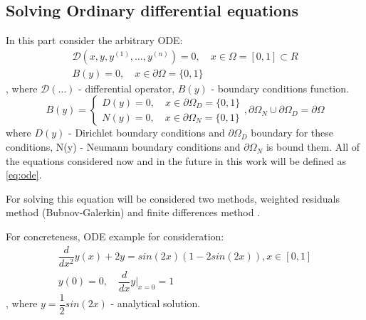 \subsection{Solving Ordinary differential equations}
In this part consider the arbitrary ODE:
\begin{equation}
	\label{eq:ode}
	\begin{multlined}
		\mathcal{D}\left (x, y, y^{(1)}, \dots, y^{(n)}\right) = 0, \quad x \in \Omega = [0, 1] \subset  R \\
		B(y) = 0, \quad x \in \partial \Omega = \{0, 1\}
	\end{multlined}
\end{equation}
, where $\mathcal{D}(\dots)$ - differential operator, $B(y)$ - boundary conditions function. 
\begin{equation*}
	B(y) = \begin{cases}
		D(y) = 0, \quad x \in \partial \Omega_D = \{0, 1\} \\
		N(y) = 0, \quad x \in \partial \Omega_N = \{0, 1\} 
	\end{cases}, \partial \Omega_N \cup \partial \Omega_D = \partial \Omega
\end{equation*}
where $D(y)$ - Dirichlet boundary conditions and $\partial \Omega_D$ boundary for these conditions, N(y) - Neumann boundary conditions and $\partial \Omega_N$ is bound them.
All of the equations considered now and in the future in this work will be defined as \eqref{eq:ode}.

For solving this equation will be considered two methods, weighted residuals method \cite{fletcher2012computational} (Bubnov-Galerkin) and finite differences method \cite{dimov2019finite}.

For concreteness, ODE example for consideration:
\begin{equation*}
	\begin{multlined}
		\dfrac{d}{d x^2} y(x) + 2y = sin(2x) \left ( 1 - 2 sin(2x) \right), x \in [0, 1]\\
		y(0) = 0, \quad \dfrac{d}{dx} y \Big|_{x = 0} = 1
	\end{multlined}
\end{equation*}
, where $y = \dfrac{1}{2} sin(2x)$ - analytical solution.

